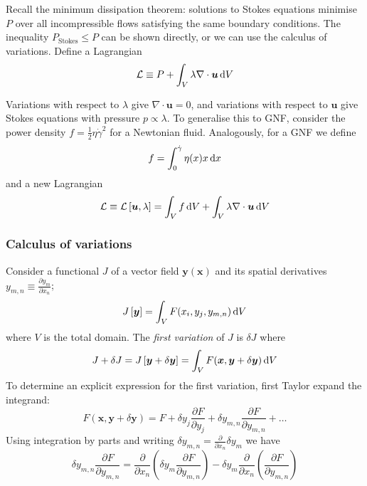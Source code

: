 \documentclass{jknotes}
\newcommand{\srate}{\dot{\gamma}}
\begin{document}
Recall the minimum dissipation theorem: solutions to Stokes equations minimise
$P$ over all incompressible flows satisfying the same boundary conditions. The
inequality $P_{\text{Stokes}} \le P$ can be shown directly, or we can use the
calculus of variations. Define a Lagrangian
\begin{equation}
	\mathcal{L} \equiv P + \int_V \lambda \nabla \cdot \bm{u} \, \diffd V
\end{equation}

Variations with respect to $\lambda$ give $\nabla \cdot \bm{u} = 0$, and
variations with respect to $\bm{u}$ give Stokes equations with pressure $p
\propto \lambda$. To generalise this to GNF, consider the power density $f =
\frac{1}{2}\eta \srate^2$ for a Newtonian fluid. Analogously, for a GNF we define
\begin{equation}
	f = \int_0^{\srate} \eta(x)x\, \diffd x
\end{equation}
and a new Lagrangian
\begin{equation}
	\mathcal{L} \equiv \mathcal{L}\left[\bm{u},\lambda\right] = \int_V f \, \diffd
	V + \int_V \lambda \nabla \cdot \bm{u}\,\diffd V
\end{equation}

\subsubsection{Calculus of variations}
Consider a functional $J$ of a vector field $\bm{y}(\bm{x})$ and its
spatial derivatives $y_{m,n} \equiv \frac{\partial y_m}{\partial x_n}$;
\begin{equation}
	J\left[\bm{y}\right] = \int_V F(x_i,y_j,y_{m,n}) \, \diffd V
\end{equation}
where $V$ is the total domain. The \emph{first variation} of $J$ is $\delta J$ where
\begin{equation}
	J + \delta J = J\left[\bm{y}+\delta\bm{y}\right] = \int_V
	F(\bm{x},\bm{y}+\delta\bm{y})\,\diffd V
\end{equation}
To determine an explicit expression for the first variation, first Taylor
expand the integrand:
\begin{equation}
	F(\bm{x},\bm{y}+\delta\bm{y}) = F + \delta y_j \frac{\partial F}{\partial
		y_j} + \delta y_{m,n} \frac{\partial F}{\partial y_{m,n}} + \dots
\end{equation}
Using integration by parts and writing $\delta y_{m,n} =
\frac{\partial}{\partial x_n} \delta y_m$ we have
\begin{equation}
	\delta y_{m,n} \frac{\partial F}{\partial y_{m,n}} = 
	\frac{\partial}{\partial x_n}\left( \delta y_m \frac{\partial F}{\partial
		y_{m,n}}\right) - \delta y_m \frac{\partial}{\partial x_n} \left(
	\frac{\partial F}{\partial y_{m,n}}\right)
\end{equation}
\end{document}
